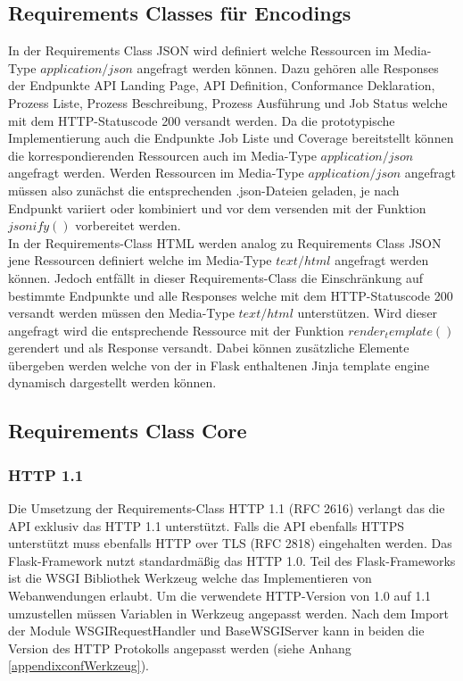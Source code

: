 \subsection{Requirements Classes für Encodings}
In der Requirements Class JSON wird definiert welche Ressourcen im Media-Type $application/json$ angefragt werden können. Dazu gehören alle Responses der 
Endpunkte API Landing Page, API Definition, Conformance Deklaration, Prozess Liste, Prozess Beschreibung, Prozess Ausführung und Job Status welche mit dem 
HTTP-Statuscode 200 versandt werden. Da die prototypische Implementierung auch die Endpunkte Job Liste und Coverage bereitstellt können die korrespondierenden
Ressourcen auch im Media-Type $application/json$ angefragt werden.
Werden Ressourcen im Media-Type $application/json$ angefragt müssen also zunächst die entsprechenden .json-Dateien geladen, je nach Endpunkt variiert oder 
kombiniert und vor dem versenden mit der Funktion $jsonify()$ vorbereitet werden. \\
In der Requirements-Class HTML werden analog zu Requirements Class JSON jene Ressourcen definiert welche im Media-Type $text/html$ angefragt werden können. Jedoch
entfällt in dieser Requirements-Class die Einschränkung auf bestimmte Endpunkte und alle Responses welche mit dem HTTP-Statuscode 200 versandt werden müssen den 
Media-Type $text/html$ unterstützen. Wird dieser angefragt wird die entsprechende Ressource mit der Funktion $render_template()$ gerendert und als Response versandt.
Dabei können zusätzliche Elemente übergeben werden welche von der in Flask enthaltenen Jinja template engine dynamisch dargestellt werden können.

\subsection{Requirements Class Core}
\subsubsection{HTTP 1.1}
Die Umsetzung der Requirements-Class HTTP 1.1 (RFC 2616) verlangt das die API exklusiv das HTTP 1.1 unterstützt. 
Falls die API ebenfalls HTTPS unterstützt muss ebenfalls HTTP over TLS (RFC 2818) eingehalten werden. 
Das Flask-Framework nutzt standardmäßig das HTTP 1.0. Teil des Flask-Frameworks ist die WSGI Bibliothek Werkzeug welche
das Implementieren von Webanwendungen erlaubt. Um die verwendete HTTP-Version von 1.0 auf 1.1 umzustellen müssen Variablen 
in Werkzeug angepasst werden. Nach dem Import der Module WSGIRequestHandler und BaseWSGIServer kann in beiden die 
Version des HTTP Protokolls angepasst werden (siehe Anhang \ref{appendixconfWerkzeug}). 

